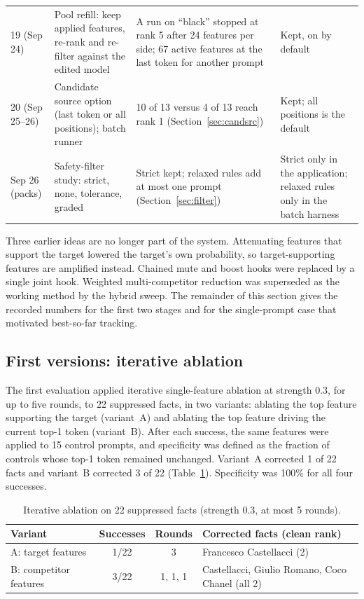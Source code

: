 \documentclass[conference]{IEEEtran}
\begin{document}
\begin{table}[t]
\begin{tabular}{@{}p{1.6cm}p{5.0cm}p{5.0cm}p{4.4cm}@{}}
19 (Sep 24) & Pool refill: keep applied features, re-rank and re-filter against the edited model & A run on ``black'' stopped at rank 5 after 24 features per side; 67 active features at the last token for another prompt & Kept, on by default\\
20 (Sep 25--26) & Candidate source option (last token or all positions); batch runner & 10 of 13 versus 4 of 13 reach rank 1 (Section~\ref{sec:candsrc}) & Kept; all positions is the default\\
Sep 26 (packs) & Safety-filter study: strict, none, tolerance, graded & Strict kept; relaxed rules add at most one prompt (Section~\ref{sec:filter}) & Strict only in the application; relaxed rules only in the batch harness\\
\bottomrule
\end{tabular}
\end{table}

Three earlier ideas are no longer part of the system. Attenuating features that support the target lowered the target's own probability, so target-supporting features are amplified instead. Chained mute and boost hooks were replaced by a single joint hook. Weighted multi-competitor reduction was superseded as the working method by the hybrid sweep. The remainder of this section gives the recorded numbers for the first two stages and for the single-prompt case that motivated best-so-far tracking.

\subsection{First versions: iterative ablation}
\label{sec:stage1}
The first evaluation applied iterative single-feature ablation at strength 0.3, for up to five rounds, to 22 suppressed facts, in two variants: ablating the top feature supporting the target (variant~A) and ablating the top feature driving the current top-1 token (variant~B). After each success, the same features were applied to 15 control prompts, and specificity was defined as the fraction of controls whose top-1 token remained unchanged. Variant~A corrected 1 of 22 facts and variant~B corrected 3 of 22 (Table~\ref{tab:stage1}). Specificity was 100\% for all four successes.

\begin{table}[t]
\caption{Iterative ablation on 22 suppressed facts (strength 0.3, at most 5 rounds).}
\label{tab:stage1}
\centering\footnotesize
\begin{tabular}{@{}lccl@{}}
\toprule
Variant & Successes & Rounds & Corrected facts (clean rank)\\
\midrule
A: target features & 1/22 & 3 & Francesco Castellacci (2)\\
B: competitor features & 3/22 & 1, 1, 1 & Castellacci, Giulio Romano, Coco Chanel (all 2)\\
\bottomrule
\end{tabular}
\end{table}
\end{document}
